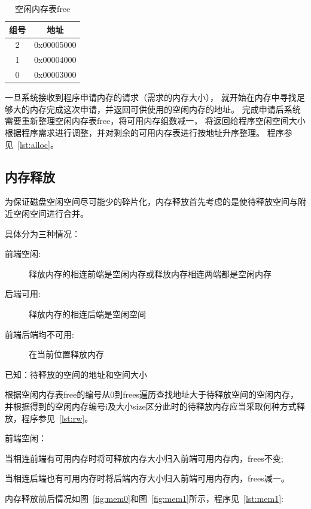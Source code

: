 \begin{table}[h]
  \centering
  \begin{tabular}{|c|c|}
    \hline 组号 & 地址 \\
    \hline 2 & 0x00005000 \\ 
    \hline 1 & 0x00004000 \\
    \hline 0 & 0x00003000 \\
    \hline
  \end{tabular}
  \caption{空闲内存表free}
  \label{tab:free}
\end{table}

一旦系统接收到程序申请内存的请求（需求的内存大小），
就开始在内存中寻找足够大的内存完成这次申请，并返回可供使用的空闲内存的地址。
完成申请后系统需要重新整理空闲内存表free，将可用内存组数减一，
将返回给程序空闲空间大小根据程序需求进行调整，并对剩余的可用内存表进行按地址升序整理。
程序参见~\ref{lst:alloc}。


\subsection{内存释放}

为保证磁盘空闲空间尽可能少的碎片化，内存释放首先考虑的是使待释放空间与附近空闲空间进行合并。

具体分为三种情况：

\begin{description}
\item[前端空闲:]释放内存的相连前端是空闲内存或释放内存相连两端都是空闲内存
\item[后端可用:]释放内存的相连后端是空闲空间
\item[前端后端均不可用:]在当前位置释放内存
\end{description}

已知：待释放的空间的地址和空间大小

根据空闲内存表free的编号从0到frees遍历查找地址大于待释放空间的空闲内存，
并根据得到的空闲内存编号i及大小size区分此时的待释放内存应当采取何种方式释放，程序参见~\ref{lst:rw}。

前端空闲：

当相连前端有可用内存时将可释放内存大小归入前端可用内存内，frees不变;

当相连后端也有可用内存时将后端内存大小归入前端可用内存内，frees减一。

内存释放前后情况如图~\ref{fig:mem0}和图~\ref{fig:mem1}所示，程序见~\ref{lst:mem1}: 

